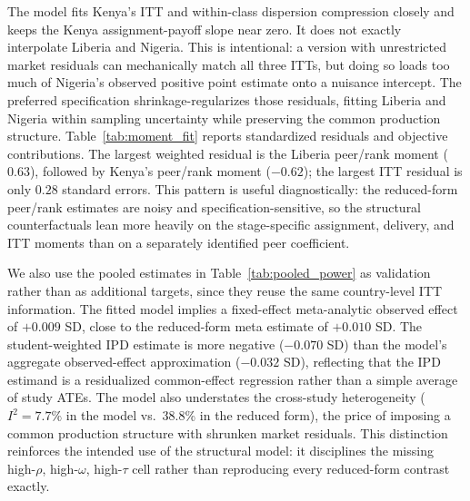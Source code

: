 \documentclass[11pt]{article}
\begin{document}
The model fits Kenya's ITT and within-class dispersion compression closely and keeps the Kenya assignment-payoff slope near zero. It does not exactly interpolate Liberia and Nigeria. This is intentional: a version with unrestricted market residuals can mechanically match all three ITTs, but doing so loads too much of Nigeria's observed positive point estimate onto a nuisance intercept. The preferred specification shrinkage-regularizes those residuals, fitting Liberia and Nigeria within sampling uncertainty while preserving the common production structure. Table~\ref{tab:moment_fit} reports standardized residuals and objective contributions. The largest weighted residual is the Liberia peer/rank moment ($0.63$), followed by Kenya's peer/rank moment ($-0.62$); the largest ITT residual is only $0.28$ standard errors. This pattern is useful diagnostically: the reduced-form peer/rank estimates are noisy and specification-sensitive, so the structural counterfactuals lean more heavily on the stage-specific assignment, delivery, and ITT moments than on a separately identified peer coefficient.

We also use the pooled estimates in Table~\ref{tab:pooled_power} as validation rather than as additional targets, since they reuse the same country-level ITT information. The fitted model implies a fixed-effect meta-analytic observed effect of $+0.009$ SD, close to the reduced-form meta estimate of $+0.010$ SD. The student-weighted IPD estimate is more negative ($-0.070$ SD) than the model's aggregate observed-effect approximation ($-0.032$ SD), reflecting that the IPD estimand is a residualized common-effect regression rather than a simple average of study ATEs. The model also understates the cross-study heterogeneity ($I^2=7.7\%$ in the model vs.\ 38.8\% in the reduced form), the price of imposing a common production structure with shrunken market residuals. This distinction reinforces the intended use of the structural model: it disciplines the missing high-$\rho$, high-$\omega$, high-$\tau$ cell rather than reproducing every reduced-form contrast exactly.
\end{document}
